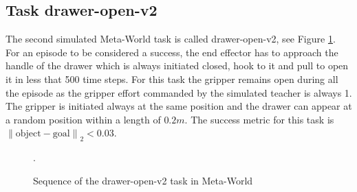 \subsection{Task drawer-open-v2}
\label{subsection:metaworld-open-drawer-task}


The second simulated Meta-World task is called drawer-open-v2, see Figure \ref{fig:sequence-drawer}. For an episode to be considered a success, the end effector has to approach the handle of the drawer which is always initiated closed, hook to it and pull to open it in less that 500 time steps.
For this task the gripper remains open during all the episode as the gripper effort commanded by the simulated teacher is always 1. The gripper is initiated always at the same position and the drawer can appear at a random position within a length of $0.2m$. The success metric for this task is ${\left\lVert \text{object}-\text{goal} \right\rVert}_2 < 0.03$.
 




 \begin{figure}[H]
  \centering
  \hspace*{\fill}%
   \hfill
   \hfill
  \hspace*{\fill}%
  \caption{Sequence of the drawer-open-v2 task in Meta-World}.
  \label{fig:sequence-drawer}
\end{figure}


